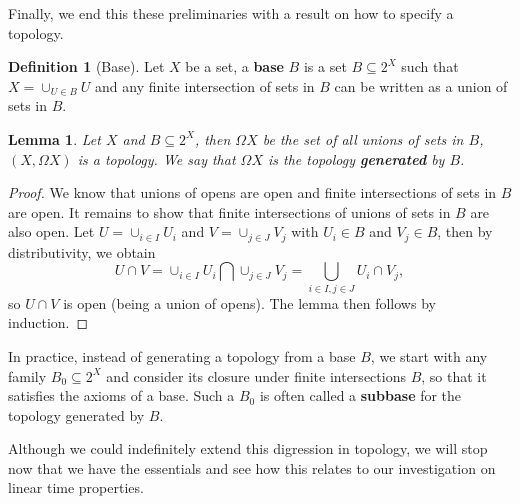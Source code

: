 \documentclass{tufte-handout} %
\newtheorem{lem}[thm]{Lemma}
\theoremstyle{definition}
\newtheorem{defn}[thm]{Definition}
\theoremstyle{remark}
\newcommand{\0}{\textsf{0}}
\newcommand{\1}{\textsf{1}}
\begin{document}
Finally, we end this these preliminaries with a result on how to specify a topology.
\begin{defn}[Base]%
	Let $X$ be a set, a \textbf{base} $B$ is a set $B\subseteq 2^X$ such that $X = \cup_{U \in B} U$ and any finite intersection of sets in $B$ can be written as a union of sets in $B$. 
\end{defn}
\begin{lem}
	Let $X$ and $B \subseteq 2^X$, then $\Omega X$ be the set of all unions of sets in $B$, $(X,\Omega X)$ is a topology. We say that $\Omega X$ is the topology \textbf{generated} by $B$.
\end{lem}
\begin{proof}
	We know that unions of opens are open and finite intersections of sets in $B$ are open. It remains to show that finite intersections of unions of sets in $B$ are also open. Let $U = \cup_{i \in I} U_i$ and $V = \cup_{j \in J} V_j$ with $U_i \in B$ and $V_j \in B$, then by distributivity, we obtain
	\[U\cap V = \cup_{i \in I} U_i \bigcap \cup_{j \in J} V_j = \bigcup_{i\in I, j \in J} U_i \cap V_j,\]
	so $U \cap V$ is open (being a union of opens). The lemma then follows by induction.
\end{proof}
In practice, instead of generating a topology from a base $B$, we start with any family $B_0 \subseteq 2^X$ and consider its closure under finite intersections $B$, so that it satisfies the axioms of a base. Such a $B_0$ is often called a \textbf{subbase} for the topology generated by $B$. 

Although we could indefinitely extend this digression in topology, we will stop now that we have the essentials and see how this relates to our investigation on linear time properties.
\end{document}
